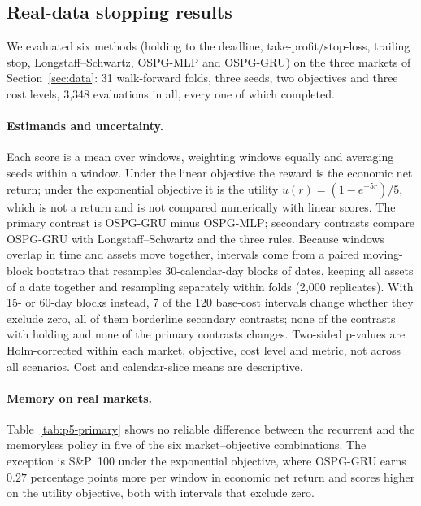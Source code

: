 \subsection{Real-data stopping results}
\label{sec:backtest}
We evaluated six methods (holding to the deadline, take-profit/stop-loss, trailing stop,
Longstaff--Schwartz, OSPG-MLP and OSPG-GRU) on the three markets of Section~\ref{sec:data}:
31 walk-forward folds, three seeds, two objectives and three cost levels, 3{,}348
evaluations in all, every one of which completed.

\paragraph{Estimands and uncertainty.}
Each score is a mean over windows, weighting windows equally and averaging seeds within a
window. Under the linear objective the reward is the economic net return; under the
exponential objective it is the utility $u(r)=(1-e^{-5r})/5$, which is not a return and is
not compared numerically with linear scores. The primary contrast is OSPG-GRU minus
OSPG-MLP; secondary contrasts compare OSPG-GRU with Longstaff--Schwartz and the three rules.
Because windows overlap in time and assets move together, intervals come from a paired
moving-block bootstrap that resamples 30-calendar-day blocks of dates, keeping all assets of
a date together and resampling separately within folds (2{,}000 replicates). With 15- or
60-day blocks instead, 7 of the 120 base-cost intervals change whether they exclude zero,
all of them borderline secondary contrasts; none of the contrasts with holding and none of
the primary contrasts changes. Two-sided p-values are Holm-corrected within each market,
objective, cost level and metric, not across all scenarios. Cost and calendar-slice means
are descriptive.

\begin{table}[ht]
\centering\scriptsize
\caption{Primary contrast at base cost: OSPG-GRU minus OSPG-MLP per window, multiplied by 100
(percentage points for the net return), with 95\% moving-block bootstrap interval and
Holm-adjusted p-value. Under the linear objective the two columns coincide.
$^{*}$: Holm-adjusted $p<0.05$.}
\label{tab:p5-primary}
\resizebox{\linewidth}{!}{}
\end{table}

\paragraph{Memory on real markets.}
Table~\ref{tab:p5-primary} shows no reliable difference between the recurrent and the
memoryless policy in five of the six market--objective combinations. The exception is
S\&P~100 under the exponential objective, where OSPG-GRU earns $0.27$ percentage points more
per window in economic net return and scores higher on the utility objective, both with
intervals that exclude zero.

